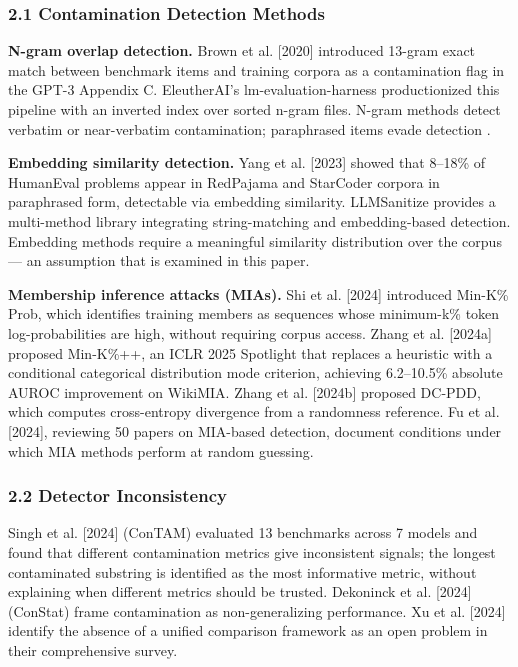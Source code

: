 
\subsubsection{2.1 Contamination Detection Methods}

\textbf{N-gram overlap detection.} Brown et al. [2020] introduced 13-gram exact match between benchmark items and training corpora as a contamination flag in the GPT-3 Appendix C. EleutherAI's lm-evaluation-harness \citep{Gaoetal2021} productionized this pipeline with an inverted index over sorted n-gram files. N-gram methods detect verbatim or near-verbatim contamination; paraphrased items evade detection \citep{Yangetal2023}.

\textbf{Embedding similarity detection.} Yang et al. [2023] showed that 8–18\% of HumanEval problems appear in RedPajama and StarCoder corpora in paraphrased form, detectable via embedding similarity. LLMSanitize \citep{Singhetal2024} provides a multi-method library integrating string-matching and embedding-based detection. Embedding methods require a meaningful similarity distribution over the corpus — an assumption that is examined in this paper.

\textbf{Membership inference attacks (MIAs).} Shi et al. [2024] introduced Min-K\% Prob, which identifies training members as sequences whose minimum-k\% token log-probabilities are high, without requiring corpus access. Zhang et al. [2024a] proposed Min-K\%++, an ICLR 2025 Spotlight that replaces a heuristic with a conditional categorical distribution mode criterion, achieving 6.2–10.5\% absolute AUROC improvement on WikiMIA. Zhang et al. [2024b] proposed DC-PDD, which computes cross-entropy divergence from a randomness reference. Fu et al. [2024], reviewing 50 papers on MIA-based detection, document conditions under which MIA methods perform at random guessing.

\subsubsection{2.2 Detector Inconsistency}

Singh et al. [2024] (ConTAM) evaluated 13 benchmarks across 7 models and found that different contamination metrics give inconsistent signals; the longest contaminated substring is identified as the most informative metric, without explaining when different metrics should be trusted. Dekoninck et al. [2024] (ConStat) frame contamination as non-generalizing performance. Xu et al. [2024] identify the absence of a unified comparison framework as an open problem in their comprehensive survey.

